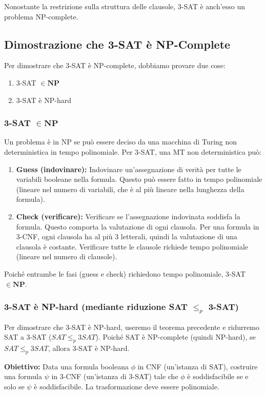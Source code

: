 \documentclass[a4paper, 11pt]{book} %
\theoremstyle{definition}
\begin{document}
Nonostante la restrizione sulla struttura delle clausole, 3-SAT è anch'esso un problema NP-complete.

\subsection{Dimostrazione che 3-SAT è NP-Complete}

Per dimostrare che 3-SAT è NP-complete, dobbiamo provare due cose:
\begin{enumerate}
    \item 3-SAT $\in \mathbf{NP}$
    \item 3-SAT è NP-hard
\end{enumerate}

\subsubsection{3-SAT $\in \mathbf{NP}$}
Un problema è in NP se può essere deciso da una macchina di Turing non deterministica in tempo polinomiale.
Per 3-SAT, una MT non deterministica può:
\begin{enumerate}
    \item \textbf{Guess (indovinare):} Indovinare un'assegnazione di verità per tutte le variabili booleane nella formula. Questo può essere fatto in tempo polinomiale (lineare nel numero di variabili, che è al più lineare nella lunghezza della formula).
    \item \textbf{Check (verificare):} Verificare se l'assegnazione indovinata soddisfa la formula. Questo comporta la valutazione di ogni clausola. Per una formula in 3-CNF, ogni clausola ha al più 3 letterali, quindi la valutazione di una clausola è costante. Verificare tutte le clausole richiede tempo polinomiale (lineare nel numero di clausole).
\end{enumerate}
Poiché entrambe le fasi (guess e check) richiedono tempo polinomiale, 3-SAT $\in \mathbf{NP}$.

\subsubsection{3-SAT è NP-hard (mediante riduzione SAT $\le_p$ 3-SAT)}

Per dimostrare che 3-SAT è NP-hard, useremo il teorema precedente e ridurremo SAT a 3-SAT ($SAT \le_p 3SAT$). Poiché SAT è NP-complete (quindi NP-hard), se $SAT \le_p 3SAT$, allora 3-SAT è NP-hard.

\textbf{Obiettivo:} Data una formula booleana $\phi$ in CNF (un'istanza di SAT), costruire una formula $\psi$ in 3-CNF (un'istanza di 3-SAT) tale che $\phi$ è soddisfacibile se e solo se $\psi$ è soddisfacibile. La trasformazione deve essere polinomiale.
\end{document}
